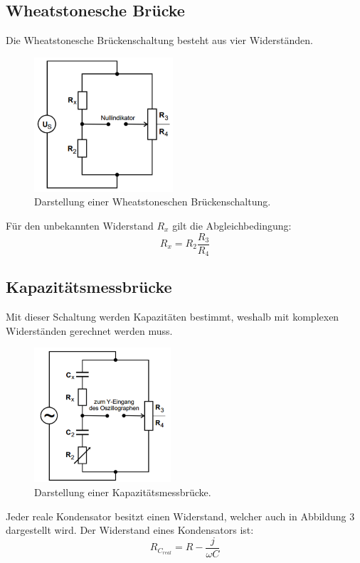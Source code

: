 \subsection{Wheatstonesche Brücke}
Die Wheatstonesche Brückenschaltung besteht aus vier Widerständen.

\begin{figure}[H]
  \centering
  \includegraphics[height=5cm]{wheat.PNG}
  \caption{Darstellung einer Wheatstoneschen Brückenschaltung. \cite{sample}}
  \label{fig:Wheat}
\end{figure}

Für den unbekannten Widerstand $R_x$ gilt die Abgleichbedingung:
\begin{equation}
  R_x = R_2 \frac{R_3}{R_4}
\end{equation}

\subsection{Kapazitätsmessbrücke}
Mit dieser Schaltung werden Kapazitäten bestimmt, weshalb mit komplexen Widerständen gerechnet werden muss.

\begin{figure}[H]
  \centering
  \includegraphics[height=5cm]{kapazitaet.PNG}
  \caption{Darstellung einer Kapazitätsmessbrücke. \cite{sample}}
  \label{fig:kapazität}
\end{figure}

Jeder  reale Kondensator besitzt einen Widerstand, welcher auch in Abbildung 3 dargestellt wird.
Der Widerstand eines Kondensators ist:
\begin{equation}
  R_{C_{real}} = R - \frac{j}{\omega C}
\end{equation}

